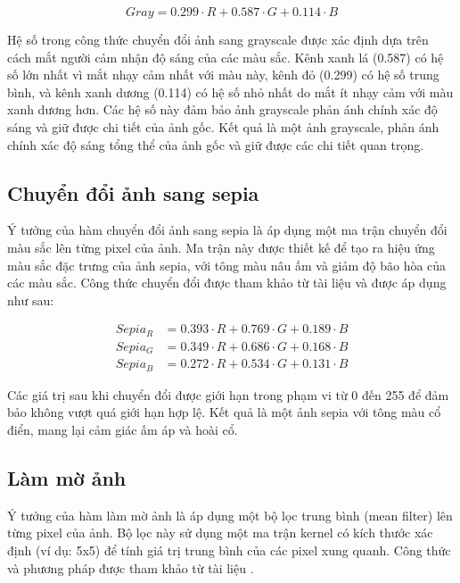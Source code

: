 \begin{equation}
	Gray = 0.299 \cdot R + 0.587 \cdot G + 0.114 \cdot B
\end{equation}


Hệ số trong công thức chuyển đổi ảnh sang grayscale được xác định dựa trên cách mắt người cảm nhận độ sáng của các màu sắc. Kênh xanh lá (0.587) có hệ số lớn nhất vì mắt nhạy cảm nhất với màu này, kênh đỏ (0.299) có hệ số trung bình, và kênh xanh dương (0.114) có hệ số nhỏ nhất do mắt ít nhạy cảm với màu xanh dương hơn. Các hệ số này đảm bảo ảnh grayscale phản ánh chính xác độ sáng và giữ được chi tiết của ảnh gốc. Kết quả là một ảnh grayscale, phản ánh chính xác độ sáng tổng thể của ảnh gốc và giữ được các chi tiết quan trọng.

\subsection{Chuyển đổi ảnh sang sepia}
Ý tưởng của hàm chuyển đổi ảnh sang sepia là áp dụng một ma trận chuyển đổi màu sắc lên từng pixel của ảnh. Ma trận này được thiết kế để tạo ra hiệu ứng màu sắc đặc trưng của ảnh sepia, với tông màu nâu ấm và giảm độ bão hòa của các màu sắc. Công thức chuyển đổi được tham khảo từ tài liệu \cite{dyclassroom_sepia_conversion} và được áp dụng như sau:

\begin{equation}
	\begin{aligned}
		Sepia_R & = 0.393 \cdot R + 0.769 \cdot G + 0.189 \cdot B \\
		Sepia_G & = 0.349 \cdot R + 0.686 \cdot G + 0.168 \cdot B \\
		Sepia_B & = 0.272 \cdot R + 0.534 \cdot G + 0.131 \cdot B
	\end{aligned}
\end{equation}

Các giá trị sau khi chuyển đổi được giới hạn trong phạm vi từ 0 đến 255 để đảm bảo không vượt quá giới hạn hợp lệ. Kết quả là một ảnh sepia với tông màu cổ điển, mang lại cảm giác ấm áp và hoài cổ.

\subsection{Làm mờ ảnh}
Ý tưởng của hàm làm mờ ảnh là áp dụng một bộ lọc trung bình (mean filter) lên từng pixel của ảnh. Bộ lọc này sử dụng một ma trận kernel có kích thước xác định (ví dụ: 5x5) để tính giá trị trung bình của các pixel xung quanh. Công thức và phương pháp được tham khảo từ tài liệu \cite{geeksforgeeks_convolution_kernels}.


